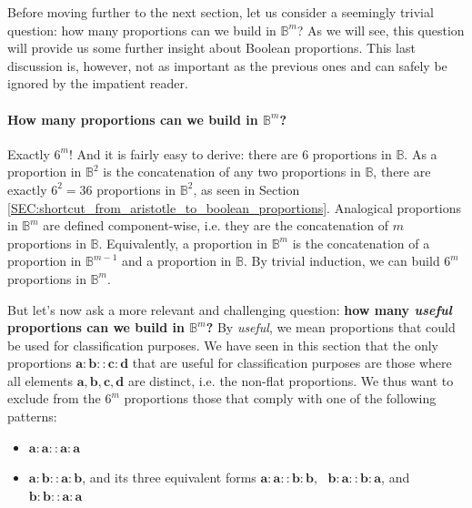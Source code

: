 Before moving further to the next section, let us  consider a seemingly trivial
question: how many proportions can we build in $\mathbb{B}^m$? As we will see,
this question will provide us some further insight about Boolean proportions.
This last discussion is, however, not as important as the previous ones and can
safely be ignored by the impatient reader.

\paragraph{How many proportions can we build in $\mathbb{B}^m$?\\}
\label{SEC:number_of_parallelograms_in_Bm}

Exactly $6^m$! And it is fairly easy to derive: there are $6$ proportions in
$\mathbb{B}$. As a proportion in $\mathbb{B}^2$ is the concatenation of any two
proportions in $\mathbb{B}$, there are exactly $6^2 = 36$ proportions in
$\mathbb{B}^2$, as seen in Section
\ref{SEC:shortcut_from_aristotle_to_boolean_proportions}. Analogical
proportions in $\mathbb{B}^m$ are defined component-wise, i.e. they are the
concatenation of $m$ proportions in $\mathbb{B}$. Equivalently, a proportion in
$\mathbb{B}^m$ is the concatenation of a proportion in $\mathbb{B}^{m - 1}$ and
a proportion in $\mathbb{B}$. By trivial induction, we can build $6^m$
proportions in $\mathbb{B}^m$.

But let's now ask a more relevant and challenging question: \textbf{how many
\textit{useful} proportions can we build in $\mathbb{B}^m$?} By
\textit{useful}, we mean proportions that could be used for classification
purposes.  We have seen in this section that the only proportions
$\mathbf{a} : \mathbf{b} :: \mathbf{c} : \mathbf{d}$ that are useful for
classification purposes are those where all elements $\mathbf{a}, \mathbf{b},
\mathbf{c}, \mathbf{d}$ are distinct, i.e. the non-flat proportions. We thus
want to exclude from the $6^m$ proportions those that comply with one of the
following patterns:

\begin{itemize}
  \item $\mathbf{a}: \mathbf{a} :: \mathbf{a} : \mathbf{a}$
  \item $\mathbf{a}: \mathbf{b} :: \mathbf{a} : \mathbf{b}$, and its three
    equivalent forms $\mathbf{a}: \mathbf{a} :: \mathbf{b} : \mathbf{b}$,~
    $\mathbf{b}: \mathbf{a} :: \mathbf{b} : \mathbf{a}$, and $\mathbf{b}:
    \mathbf{b} :: \mathbf{a} : \mathbf{a}$
\end{itemize}

